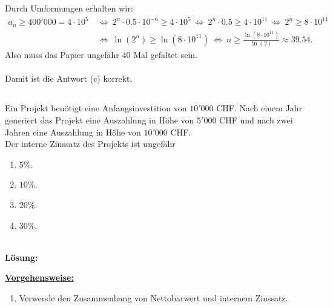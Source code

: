 Durch Umformungen erhalten wir:
\begin{align*}
	a_n \geq 400'000 = 4 \cdot 10^5
	\ &\Leftrightarrow \
	2^n \cdot 0.5 \cdot 10^{-6}  \geq 4 \cdot 10^5
	\ \Leftrightarrow \
	2^n \cdot 0.5 \geq 4 \cdot 10^{11}
	\ \Leftrightarrow \
	2^n \geq 8 \cdot 10^{11}\\
	\ &\Leftrightarrow \
	\ln(2^n) \geq \ln\left(8 \cdot 10^{11}\right)
	\ \Leftrightarrow \
	n  \geq \frac{\ln\left(8 \cdot 10^{11}\right)}{\ln(2)} \approx 39.54.
\end{align*}
Also muss das Papier ungefähr $ 40 $ Mal gefaltet sein.\\
\\
Damit ist die Antwort (c) korrekt.


\newpage
\subsection*{}
Ein Projekt benötigt eine Anfangsinvestition von $ 10'000 $ CHF.
Nach einem Jahr generiert das Projekt eine Auszahlung in Höhe von $ 5'000  $ CHF und nach zwei Jahren eine Auszahlung in Höhe von $ 10'000 $ CHF.\\
Der interne Zinssatz des Projekts ist ungefähr
\renewcommand{\labelenumi}{(\alph{enumi})}
\begin{enumerate}
	\item 
	$ 5 \% $.
	\item 
	$ 10 \% $.
	\item
	$ 20 \% $.
	\item
	$ 30 \% $.
\end{enumerate}
\ \\
\textbf{Lösung:}
\begin{mdframed}
\underline{\textbf{Vorgehensweise:}}
\renewcommand{\labelenumi}{\theenumi.}
\begin{enumerate}
\item Verwende den Zusammenhang von Nettobarwert und internem Zinssatz.

\end{enumerate}
\end{mdframed}

